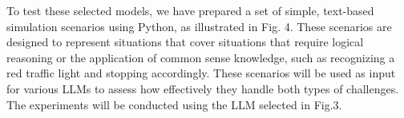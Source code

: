\documentclass[conference]{IEEEtran}
\begin{document}
To test these selected models, we have prepared a set of simple, text-based simulation scenarios using Python, as illustrated in Fig. 4. These scenarios are designed to represent situations that cover situations that require logical reasoning or the application of common sense knowledge, such as recognizing a red traffic light and stopping accordingly.
These scenarios will be used as input for various LLMs to assess how effectively they handle both types of challenges. The experiments will be conducted using the LLM selected in Fig.3. 









\end{document}
